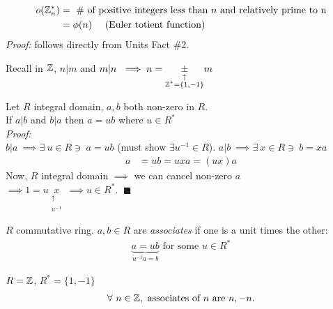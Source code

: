 \setcounter{dummy_lemma}{0}
\begin{corollary}
    \begin{align*}
        o({\mathbb{ Z}}_n^*) &= \text{ \# of positive integers less than }n\text{ and relatively prime to n}\\
        &= \phi(n) \ \ \ \ (\text{Euler totient function})
    \end{align*}
    \textit{Proof:} follows directly from Units Fact \#2.
\end{corollary}
Recall in ${\mathbb{ Z}}$, $n|m$ and $m|n \ \implies n=\underset{\substack{\uparrow \\ {\mathbb{ Z}}^*=\{1,-1\}}}{\pm} m$
\setcounter{dummy_lemma}{1}
\begin{lemma}
    Let $R$ integral domain, $a,b$ both non-zero in $R$. \\
    \noindent If $a|b$ and $b|a$ then $a=ub$ where $u\in R^*$ \\
    \noindent \textit{Proof:} \\
    \noindent $b|a \ \implies \exists \ u \in R \ni \ a=ub$ (must show $\exists u^{-1} \in R$).
    \noindent $a|b \ \implies \exists \ x \in R \ni \ b=xa$
    \begin{align*}
        a&= ub =uxa=(ux)a
    \end{align*}
    Now, $R$ integral domain $\implies$ we can cancel non-zero $a$ \\
    \noindent $\implies 1=u\underset{\substack{\uparrow \\ u^{-1}}}{x} \ \implies u \in R^*$. $\ \blacksquare$
\end{lemma}

\begin{definition}[Associates]
    $R$ commutative ring. $a,b\in R$ are \textit{associates} if one is a unit times the other:
    \begin{align*}
        \underbrace{a=ub}_{u^{-1}a=b} \text{ for some } u\in R^*
    \end{align*}
\end{definition}

\begin{example}
    $R={\mathbb{ Z}}$, $R^*=\{1,-1\}$
    \begin{align*}
        \forall \ n \in {\mathbb{ Z}}, \text{ associates of }n \text{ are }n,-n.
    \end{align*}
\end{example}

